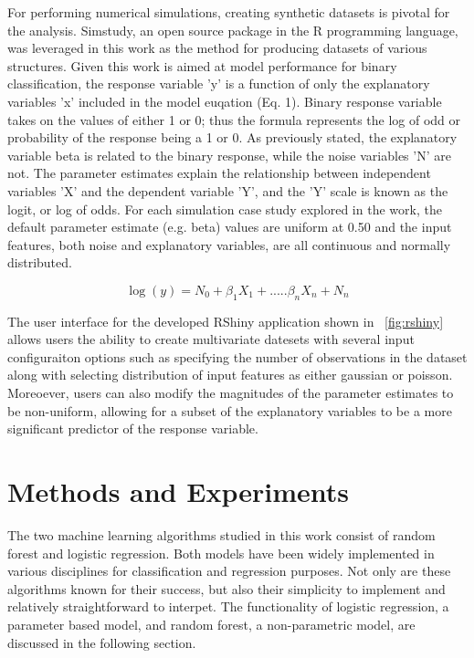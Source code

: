 \documentclass{llncs}
\begin{document}
For performing numerical simulations, creating synthetic datasets is pivotal for the analysis. Simstudy, an open source package in the R programming language, was leveraged in this work as the method for producing datasets of various structures. Given this work is aimed at model performance for binary classification, the response variable 'y' is a function of only the explanatory variables 'x' included in the model euqation (Eq. 1). Binary response variable takes on the values of either 1 or 0; thus the formula represents the log of odd or probability of the response being a 1 or 0. As previously stated, the explanatory variable beta is related to the binary response, while the noise variables 'N' are not. The parameter estimates explain the relationship between independent variables 'X' and the dependent variable 'Y', and the 'Y' scale is known as the logit, or log of odds. For each simulation case study explored in the work, the default parameter estimate (e.g. beta) values are uniform at 0.50 and the input features, both noise and explanatory variables, are all continuous and normally distributed. 

\begin{equation}
\log(y) = N_{0} + \beta_{1}X_{1} + .....\beta_{n}X_{n} + N_{n} 
\end{equation}

The user interface for the developed RShiny application shown in ~\ref{fig:rshiny} allows users the ability to create multivariate datesets with several input configuraiton options such as specifying the number of observations in the dataset along with selecting distribution of input features as either gaussian or poisson. Moreoever, users can also modify the magnitudes of the parameter estimates to be non-uniform, allowing for a subset of the explanatory variables to be a more significant predictor of the response variable. 


\section{Methods and Experiments}

The two machine learning algorithms studied in this work consist of random forest and logistic regression. Both models have been widely implemented in various disciplines for classification and regression purposes. Not only are these algorithms known for their success, but also their simplicity to implement and relatively straightforward to interpet. The functionality of logistic regression, a parameter based model, and random forest, a non-parametric model, are discussed in the following section. 
\end{document}
